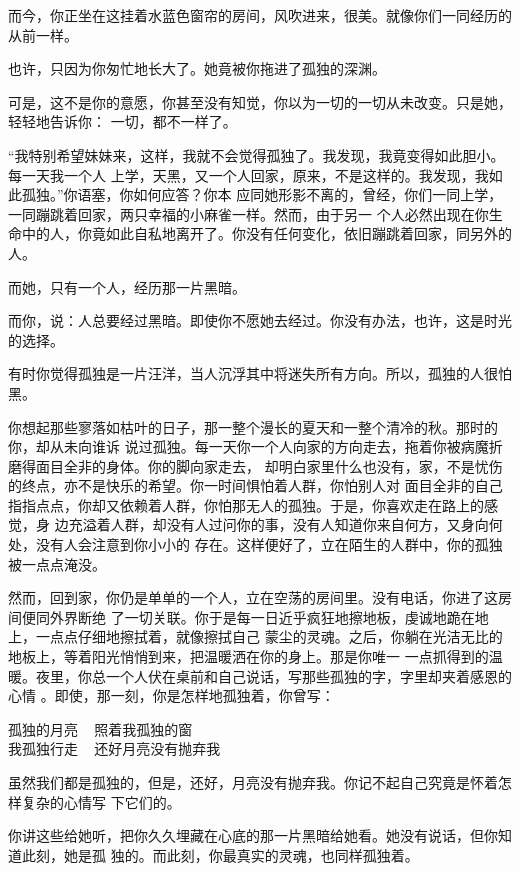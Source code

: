 \documentclass[12pt,a4paper]{article}
\begin{document}
		而今，你正坐在这挂着水蓝色窗帘的房间，风吹进来，很美。就像你们一同经历的从前一样。

		也许，只因为你匆忙地长大了。她竟被你拖进了孤独的深渊。

		可是，这不是你的意愿，你甚至没有知觉，你以为一切的一切从未改变。只是她，轻轻地告诉你：
	一切，都不一样了。

		“我特别希望妹妹来，这样，我就不会觉得孤独了。我发现，我竟变得如此胆小。每一天我一个人
	上学，天黑，又一个人回家，原来，不是这样的。我发现，我如此孤独。”你语塞，你如何应答？你本
	应同她形影不离的，曾经，你们一同上学，一同蹦跳着回家，两只幸福的小麻雀一样。然而，由于另一
	个人必然出现在你生命中的人，你竟如此自私地离开了。你没有任何变化，依旧蹦跳着回家，同另外的
	人。

		而她，只有一个人，经历那一片黑暗。

		而你，说：人总要经过黑暗。即使你不愿她去经过。你没有办法，也许，这是时光的选择。

		有时你觉得孤独是一片汪洋，当人沉浮其中将迷失所有方向。所以，孤独的人很怕黑。

		你想起那些寥落如枯叶的日子，那一整个漫长的夏天和一整个清冷的秋。那时的你，却从未向谁诉
	说过孤独。每一天你一个人向家的方向走去，拖着你被病魔折磨得面目全非的身体。你的脚向家走去，
	却明白家里什么也没有，家，不是忧伤的终点，亦不是快乐的希望。你一时间惧怕着人群，你怕别人对
	面目全非的自己指指点点，你却又依赖着人群，你怕那无人的孤独。于是，你喜欢走在路上的感觉，身
	边充溢着人群，却没有人过问你的事，没有人知道你来自何方，又身向何处，没有人会注意到你小小的
	存在。这样便好了，立在陌生的人群中，你的孤独被一点点淹没。

		然而，回到家，你仍是单单的一个人，立在空荡的房间里。没有电话，你进了这房间便同外界断绝
	了一切关联。你于是每一日近乎疯狂地擦地板，虔诚地跪在地上，一点点仔细地擦拭着，就像擦拭自己
	蒙尘的灵魂。之后，你躺在光洁无比的地板上，等着阳光悄悄到来，把温暖洒在你的身上。那是你唯一
	一点抓得到的温暖。夜里，你总一个人伏在桌前和自己说话，写那些孤独的字，字里却夹着感恩的心情
	。即使，那一刻，你是怎样地孤独着，你曾写：

		\longpoem{}{}{}
		孤独的月亮 ~ 照着我孤独的窗 \\
		我孤独行走 ~ 还好月亮没有抛弃我
		\endlongpoem

		虽然我们都是孤独的，但是，还好，月亮没有抛弃我。你记不起自己究竟是怀着怎样复杂的心情写
	下它们的。

		你讲这些给她听，把你久久埋藏在心底的那一片黑暗给她看。她没有说话，但你知道此刻，她是孤
	独的。而此刻，你最真实的灵魂，也同样孤独着。
\end{document}
